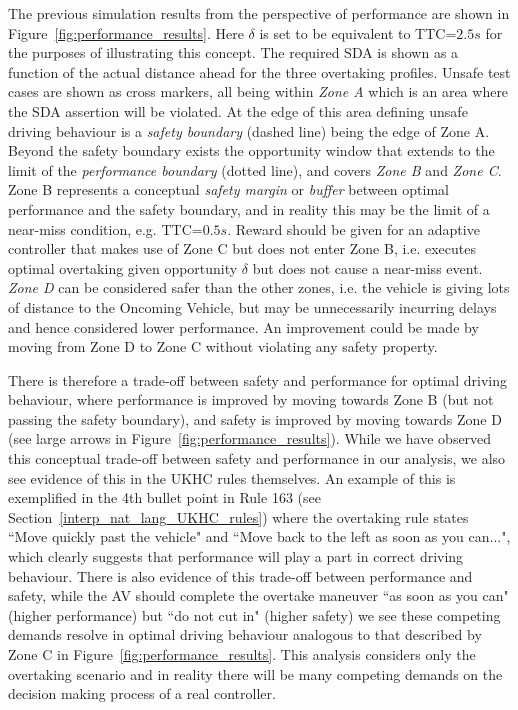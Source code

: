 The previous simulation results from the perspective of performance are shown in Figure~\ref{fig:performance_results}. Here $\delta$ is set to be equivalent to TTC=$2.5s$ \cite{Robbins2018,Chen2015,wang2019analysis} for the purposes of illustrating this concept. The required SDA is shown as a function of the actual distance ahead for the three overtaking profiles. Unsafe test cases are shown as cross markers, all being within \emph{Zone A} which is an area where the SDA assertion will be violated. At the edge of this area defining unsafe driving behaviour is a \emph{safety boundary} (dashed line) being the edge of Zone A. Beyond the safety boundary exists the opportunity window that extends to the limit of the \emph{performance boundary} (dotted line), and covers \emph{Zone B} and \emph{Zone C}. Zone B represents a conceptual \emph{safety margin} or \emph{buffer} between optimal performance and the safety boundary, and in reality this may be the limit of a near-miss condition, e.g. TTC=$0.5s$. Reward should be given for an adaptive controller that makes use of Zone C but does not enter Zone B, i.e. executes optimal overtaking given opportunity $\delta$ but does not cause a near-miss event. \emph{Zone D} can be considered safer than the other zones, i.e. the vehicle is giving lots of distance to the Oncoming Vehicle, but may be unnecessarily incurring delays and hence considered lower performance. An improvement could be made by moving from Zone D to Zone C without violating any safety property. 

There is therefore a trade-off between safety and performance for optimal driving behaviour, where performance is improved by moving towards Zone B (but not passing the safety boundary), and safety is improved by moving towards Zone D (see large arrows in Figure~\ref{fig:performance_results}). While we have observed this conceptual trade-off between safety and performance in our analysis, we also see evidence of this in the UKHC rules themselves. An example of this is exemplified in the 4th bullet point in Rule 163 (see Section~\ref{interp_nat_lang_UKHC_rules}) where the overtaking rule states ``Move quickly past the vehicle" and ``Move back to the left as soon as you can...", which clearly suggests that performance will play a part in correct driving behaviour. There is also evidence of this trade-off between performance and safety, while the AV should complete the overtake maneuver ``as soon as you can" (higher performance) but ``do not cut in" (higher safety) we see these competing demands resolve in optimal driving behaviour analogous to that described by Zone C in Figure~\ref{fig:performance_results}. This analysis considers only the overtaking scenario and in reality there will be many competing demands on the decision making process of a real controller. 

